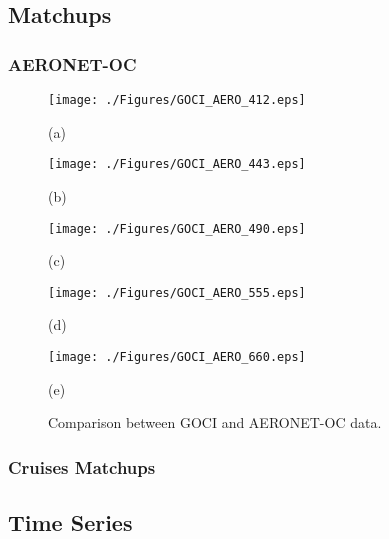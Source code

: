 \documentclass[12pt]{spieman}  %
\begin{document}
\begin{spacing}{2}
\subsection{Matchups}
\subsubsection{AERONET-OC}

\begin{figure}[htb!]
    \begin{minipage}[c]{0.48\linewidth}
      \centering
      \texttt{[image: ./Figures/GOCI\_AERO\_412.eps]}
    \centerline{(a)}\medskip
    \end{minipage}  
    \hfill
    \begin{minipage}[c]{0.48\linewidth}
      \centering
      \texttt{[image: ./Figures/GOCI\_AERO\_443.eps]}
      \centerline{(b)}\medskip
    \end{minipage}  

  \begin{minipage}[c]{0.48\linewidth}
      \centering
      \texttt{[image: ./Figures/GOCI\_AERO\_490.eps]}
    \centerline{(c)}\medskip
    \end{minipage}  
    \hfill
    \begin{minipage}[c]{0.48\linewidth}
      \centering
      \texttt{[image: ./Figures/GOCI\_AERO\_555.eps]}
      \centerline{(d)}\medskip
    \end{minipage}  

  \begin{minipage}[c]{1.0\linewidth}
      \centering
      \texttt{[image: ./Figures/GOCI\_AERO\_660.eps]}
      \centerline{(e)}\medskip
    \end{minipage}   

    \caption{Comparison between GOCI and AERONET-OC data. \label{fig:GOCI_AERO} } 
\end{figure}
\subsubsection{Cruises Matchups}

\subsection{Time Series}


\end{spacing}
\end{document}
